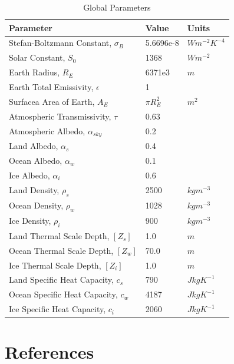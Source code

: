 \documentclass[12pt]{article}
\begin{document}
\begin{table}
    \captionsetup{singlelinecheck = false, justification=justified}
    \caption{Global Parameters}
    \begin{tabular}{lll}
    \hline
    Parameter & Value & Units\\
    \hline
    Stefan-Boltzmann Constant, $\sigma_B$ & 5.6696e-8 & $Wm^{-2}K^{-4}$ \\
    Solar Constant, $S_0$ & 1368 & $Wm^{-2}$ \\
    Earth Radius, $R_E$ & 6371e3 & $m$ \\
    Earth Total Emissivity, $\epsilon$  & 1  \\
    Surfacea Area of Earth, $A_E$ & $\pi R_E^2$ & $m^2$ \\
    Atmospheric Transmissivity, $\tau$ & 0.63  \\
    Atmospheric Albedo, $\alpha_{sky}$ & 0.2 \\
    Land Albedo, $\alpha_s$ & 0.4 \\
    Ocean Albedo, $\alpha_w$ & 0.1\\
    Ice Albedo, $\alpha_i$ & 0.6 \\
    Land Density, $\rho_s$ & 2500 & $kgm^{-3}$\\
    Ocean Density, $\rho_w$ & 1028 & $kgm^{-3}$\\
    Ice Density, $\rho_i$ & 900 & $kgm^{-3}$\\
    Land Thermal Scale Depth, $[Z_s]$ & 1.0 & $m$ \\
    Ocean Thermal Scale Depth, $[Z_w]$ & 70.0 & $m$ \\
    Ice Thermal Scale Depth, $[Z_i]$ & 1.0 & $m$ \\
    Land Specific Heat Capacity, $c_s$ & 790 & $JkgK^{-1}$\\
    Ocean Specific Heat Capacity, $c_w$ & 4187 & $JkgK^{-1}$\\
    Ice Specific Heat Capacity, $c_i$ & 2060 & $JkgK^{-1}$\\
    \end{tabular}
    \label{tab:globalparams}
\end{table}
\FloatBarrier

\newpage
\section{References}
\printbibliography
\end{document}
